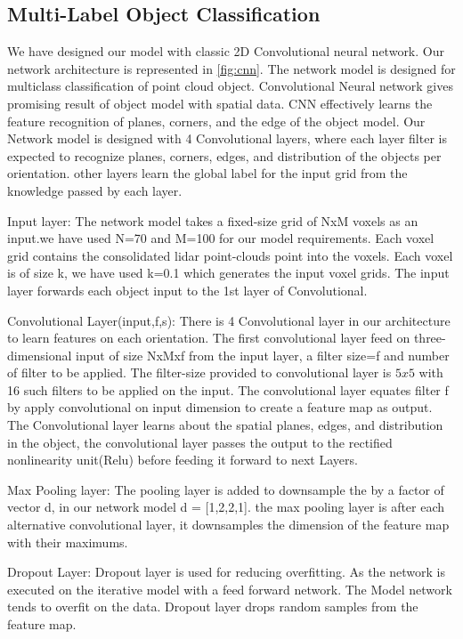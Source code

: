 
\subsection{Multi-Label Object Classification}

We have designed our model with classic 2D Convolutional neural network.
Our network architecture is represented in \ref{fig:cnn}.
The network model is designed for multiclass classification of point cloud object. Convolutional Neural network gives promising result of object model with spatial data. CNN effectively learns the feature recognition of planes, corners, and the edge of the object model. Our Network model is designed with 4 Convolutional layers, where each layer filter is expected to recognize
planes, corners, edges, and distribution of the objects per orientation.
other layers learn the global label for the input grid from the knowledge passed by each layer.

Input layer:
The network model takes a fixed-size grid of NxM voxels as an input.we have used N=70 and M=100 for our model requirements.
Each voxel grid contains the consolidated lidar point-clouds point into the voxels. Each voxel is of size k, we have used k=0.1
which generates the input voxel grids. The input layer forwards each object input to the 1st layer of Convolutional.


Convolutional Layer(input,f,s):
There is 4 Convolutional layer in our architecture to learn features on each orientation.
The first convolutional layer feed on three-dimensional input of size NxMxf from the input layer, a filter size=f and number of filter to be applied.
The filter-size provided to convolutional layer is $5x5$ with 16 such filters to be applied on the input.
The convolutional layer equates filter f by apply convolutional on input dimension to create a feature map as output.
The Convolutional layer learns about the spatial planes, edges, and distribution in the object, the convolutional layer passes the output to the rectified nonlinearity unit(Relu) before feeding it forward to next Layers.

Max Pooling layer:
The pooling layer is added to downsample the by a factor of vector d, in our network model d = [1,2,2,1].
the max pooling layer is after each alternative convolutional layer, it downsamples the dimension of the feature map with their maximums.

Dropout Layer:
Dropout layer is used for reducing overfitting. As the network is executed on the iterative model with a feed forward network.
The Model network tends to overfit on the data. Dropout layer drops random samples from the feature map.

